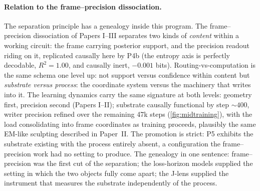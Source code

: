 \documentclass[11pt]{article}
\begin{document}
\paragraph{Relation to the frame--precision dissociation.} The
separation principle has a genealogy inside this program. The
frame--precision dissociation of Papers I--III separates two kinds of
\emph{content} within a working circuit: the frame carrying posterior
support, and the precision readout riding on it, replicated causally
here by P4b (the entropy axis is perfectly decodable, $R^2 = 1.00$, and
causally inert, $-0.001$ bits). Routing-vs-computation is the same
schema one level up: not support versus confidence within content but
\emph{substrate versus process}: the coordinate system versus the
machinery that writes into it. The learning dynamics carry the same
signature at both levels: geometry first, precision second (Papers
I--II); substrate causally functional by step ${\sim}400$, writer
precision refined over the remaining 47k steps (\cref{fig:midtraining}),
with the load consolidating into frame coordinates as training
proceeds, plausibly the same EM-like sculpting described in Paper~II.
The promotion is strict: P5 exhibits the
substrate existing with the process entirely absent, a configuration
the frame--precision work had no setting to produce. The genealogy in one
sentence: frame--precision was the first cut of the separation;
the loss-horizon models supplied the setting in which the two objects
fully come apart; the J-lens supplied the instrument that measures the
substrate independently of the process.
\end{document}
